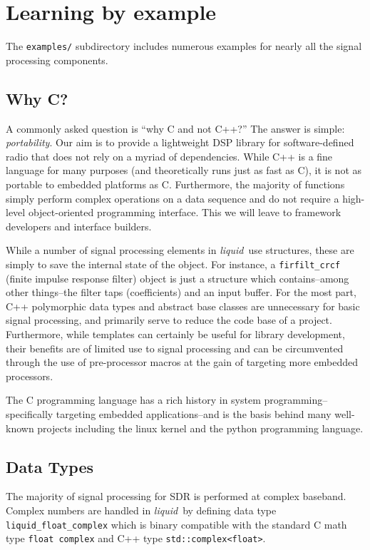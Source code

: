 \documentclass[11pt,twoside]{report}
\newcommand{\liquid}{{\it liquid}}
\begin{document}
\section{Learning by example}
The {\tt examples/} subdirectory includes numerous examples for nearly all the
signal processing components.

\subsection{Why C?}
A commonly asked question is ``why C and not C++?''
The answer is simple: {\em portability}.
Our aim is to provide a lightweight DSP library for software-defined radio
that does not rely on a myriad of dependencies.
While C++ is a fine language for many purposes (and theoretically runs just as
fast as C), it is not as portable to embedded platforms as C.
Furthermore, the majority of functions simply perform complex operations on a
data sequence and do not require a high-level object-oriented programming
interface.
This we will leave to framework developers and interface builders.

While a number of signal processing elements in \liquid\ use structures, these
are simply to save the internal state of the object.
For instance, a {\tt firfilt\_crcf} (finite impulse response filter) object
is just a structure which contains--among other things--the filter taps
(coefficients) and an input buffer.
For the most part, C++ polymorphic data types and abstract base classes are
unnecessary for basic signal processing, and primarily serve to reduce the
code base of a project.
Furthermore, while templates can certainly be useful for library development,
their benefits are of limited use to signal processing and can be circumvented
through the use of pre-processor macros at the gain of targeting more embedded
processors.

The C programming language has a rich history in system programming--
specifically targeting embedded applications--and is the basis behind many
well-known projects including the linux kernel and the python programming
language.

\subsection{Data Types}
The majority of signal processing for SDR is performed at complex baseband.
Complex numbers are handled in \liquid\ by defining data type
{\tt liquid\_float\_complex} which is binary compatible with the standard
C math type {\tt float complex} and C++ type {\tt std::complex<float>}.
\end{document}
